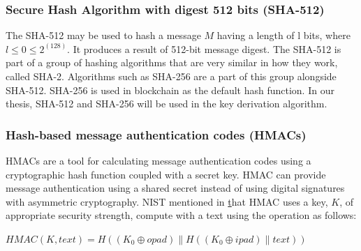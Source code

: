 \subsubsection{Secure Hash Algorithm with digest 512 bits (SHA-512)}

The SHA-512 may be used to hash a message $M$ having a length of l bits, where $l \leq 0 \leq 2^(128)$. It produces a result of 512-bit message digest. The SHA-512 is part of a group of hashing algorithms that are very similar in how they work, called SHA-2. Algorithms such as SHA-256 are a part of this group alongside SHA-512. SHA-256 is used in blockchain as the default hash function. In our thesis, SHA-512 and SHA-256 will be used in the key derivation algorithm. \\

\subsubsection{Hash-based message authentication codes (HMACs)}

HMACs are a tool for calculating message authentication codes using a cryptographic hash function coupled with a secret key. HMAC can provide message authentication using a shared secret instead of using digital signatures with asymmetric cryptography. NIST mentioned in \href{https://nvlpubs.nist.gov/nistpubs/FIPS/NIST.FIPS.198-1.pdf} that HMAC uses a key, $K$, of appropriate security strength, compute with a text using the operation as follows:\\
\vspace{0.2cm}
\begin{center}
$HMAC(K, text) = H((K_0 \oplus opad )\| H((K_0 \oplus ipad) \| text))$\\
\end{center}
\vspace{0.2cm}

